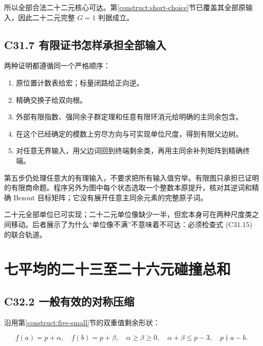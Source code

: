 {所以全部合法二十二元核心可达。}第\ref{construct:short-choice}节{已覆盖其全部原输入，因此二十二元完整} {\ensuremath{G=1}} {判据成立。}

\subsection*{\texorpdfstring{{C31.7} {有限证书怎样承担全部输入}}{C31.7 有限证书怎样承担全部输入}}\label{C31-h207}

{两种证明都遵循同一个严格顺序：}

\begin{enumerate}
\def\labelenumi{\arabic{enumi}.}
\tightlist
\item
  {原位置计数表给宏；标量闭路给正向逆。}
\item
  {精确交换子给双向根。}
\item
  {外部有限指数、强同余子群定理和任意有限环消元给明确的主同余包含。}
\item
  {在这个已经确定的模数上穷尽方向与可实现单位尺度，得到有限父边树。}
\item
  {对任意无界输入，用父边词回到终端剩余类，再用主同余补列矩阵到精确终端。}
\end{enumerate}

{第五步仍处理任意大的有理输入，不要求把所有输入值穷举。有限图只承担已证明的有限商命题。程序另外为图中每个状态选取一个整数本原提升，核对其逆词和精确} {Bezout} {目标矩阵；它没有展开任意主同余元素的完整原子词。}

{二十元全部单位已可实现；二十二元单位像缺少一半，但宏本身可在两种尺度类之间移动。后者展示了为什么``单位像不满''不意味着不可达：必须检查式} {(C31.15)} {的联合轨道。}


\section{七平均的二十三至二十六元碰撞总和}\label{construct:seven-collisions}
\subsection*{\texorpdfstring{{C32.2} {一般有效的对称压缩}}{C32.2 一般有效的对称压缩}}\label{C32-h208}

{沿用}第\ref{construct:five-small}节{的双重值剩余形状：}

\[
f(a)=p+\alpha,\quad f(b)=p+\beta,
\quad\alpha\ge\beta\ge0,\quad\alpha+\beta\le p-3,
\quad p\nmid a-b.
\]

